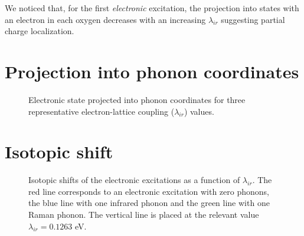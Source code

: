 We noticed\cite{GarciaSaraviaOrtizdeMontellano2013} that, for the first \textit{electronic} excitation, the projection into states with an electron in each oxygen decreases with an increasing $\lambda_{ir}$ suggesting partial charge localization.

\section{Projection into phonon coordinates}

\begin{figure}[ht]
  \centering
  
  \caption{Electronic state projected into phonon coordinates for three representative electron-lattice coupling ($\lambda_{ir}$) values.}
  \label{fig:phononProjElectr}
\end{figure}

\section{Isotopic shift}

\begin{figure}[ht]
  \centering
  
  \caption[Isotopic shift of the electronic excitations as a function of $\lambda_{ir}$.]
  {Isotopic shifts of the electronic excitations as a function of $\lambda_{ir}$. 
    The red line corresponds to an electronic excitation with zero phonons, the blue line with one infrared phonon and the green line with one Raman phonon.
    The vertical line is placed at the relevant value $\lambda_{ir}=0.1263$ eV.}
  \label{fig:electrIsot}
\end{figure}


